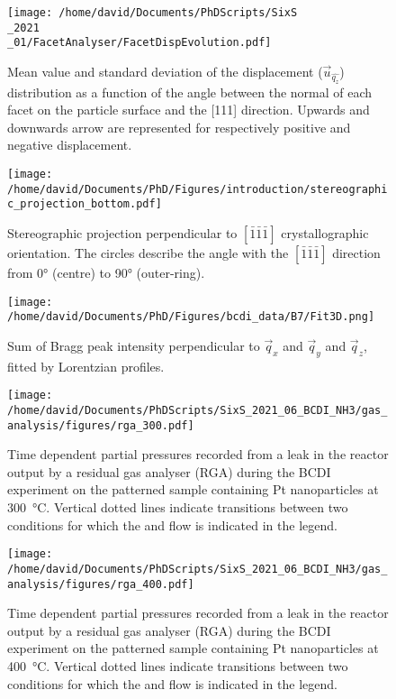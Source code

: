 \begin{figure}[!htb]
    \centering
    \texttt{[image: /home/david/Documents/PhDScripts/SixS\\\_2021\\\_01/FacetAnalyser/FacetDispEvolution.pdf]}
    \caption{
        Mean value and standard deviation of the displacement ($\vec{u}_{\hat{q_z}}$) distribution as a function of the angle between the normal of each facet on the particle surface and the [111] direction.
        Upwards and downwards arrow are represented for respectively positive and negative displacement.
    }
    \label{fig:AmaterasuDisplacement}
\end{figure}

\begin{figure}[!htb]
    \centering
    \texttt{[image: /home/david/Documents/PhD/Figures/introduction/stereographic\_projection\_bottom.pdf]}
    \caption{
        Stereographic projection perpendicular to $[\bar{1}\bar{1}\bar{1}]$ crystallographic orientation.
        The circles describe the angle with the $[\bar{1}\bar{1}\bar{1}]$ direction from \ang{0} (centre) to \ang{90} (outer-ring).
    }
    \label{fig:StereoBottom}
\end{figure}

\begin{figure}[!htb]
    \centering
    \texttt{[image: /home/david/Documents/PhD/Figures/bcdi\_data/B7/Fit3D.png]}
    \caption{
        Sum of Bragg peak intensity perpendicular to $\vec{q}_x$ and $\vec{q}_y$ and $\vec{q}_z$, fitted by Lorentzian profiles.
    }
    \label{fig:FitB73D}
\end{figure}

\begin{figure}[!htb]
    \centering
    \texttt{[image: /home/david/Documents/PhDScripts/SixS\_2021\_06\_BCDI\_NH3/gas\_analysis/figures/rga\_300.pdf]}
    \caption{
        Time dependent partial pressures recorded from a leak in the reactor output by a residual gas analyser (RGA) during the BCDI experiment on the patterned sample containing Pt nanoparticles at \qty{300}{\degreeCelsius}.
        Vertical dotted lines indicate transitions between two conditions for which the  and  flow is indicated in the legend.
    }
    \label{fig:RGA300BCDINanoparticles}
\end{figure}

\begin{figure}[!htb]
    \centering
    \texttt{[image: /home/david/Documents/PhDScripts/SixS\_2021\_06\_BCDI\_NH3/gas\_analysis/figures/rga\_400.pdf]}
    \caption{
        Time dependent partial pressures recorded from a leak in the reactor output by a residual gas analyser (RGA) during the BCDI experiment on the patterned sample containing Pt nanoparticles at \qty{400}{\degreeCelsius}.
        Vertical dotted lines indicate transitions between two conditions for which the  and  flow is indicated in the legend.
    }
    \label{fig:RGA400BCDINanoparticles}
\end{figure}
